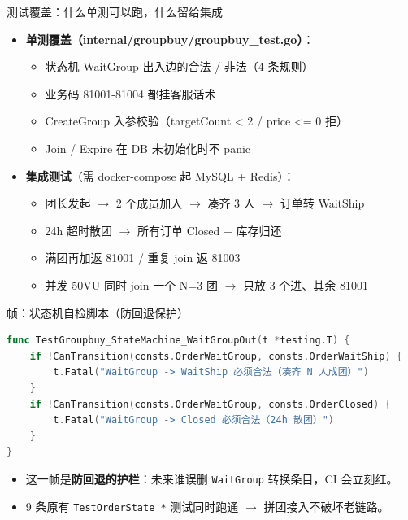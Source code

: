 \documentclass[aspectratio=169,11pt]{beamer}
\begin{document}
\begin{frame}[shrink]{测试覆盖：什么单测可以跑，什么留给集成}
\begin{itemize}
  \item \textbf{单测覆盖（internal/groupbuy/groupbuy\_test.go）}：
  \begin{itemize}
    \item 状态机 WaitGroup 出入边的合法 / 非法（4 条规则）
    \item 业务码 81001-81004 都挂客服话术
    \item CreateGroup 入参校验（targetCount < 2 / price <= 0 拒）
    \item Join / Expire 在 DB 未初始化时不 panic
  \end{itemize}
  \item \textbf{集成测试}（需 docker-compose 起 MySQL + Redis）：
  \begin{itemize}
    \item 团长发起 $\to$ 2 个成员加入 $\to$ 凑齐 3 人 $\to$ 订单转 WaitShip
    \item 24h 超时散团 $\to$ 所有订单 Closed + 库存归还
    \item 满团再加返 81001 / 重复 join 返 81003
    \item 并发 50VU 同时 join 一个 N=3 团 $\to$ 只放 3 个进、其余 81001
  \end{itemize}
\end{itemize}
\end{frame}

\begin{frame}{帧：状态机自检脚本（防回退保护）}
\begin{lstlisting}[language=Go,caption={internal/groupbuy/groupbuy\_test.go 状态机检查}]
func TestGroupbuy_StateMachine_WaitGroupOut(t *testing.T) {
    if !CanTransition(consts.OrderWaitGroup, consts.OrderWaitShip) {
        t.Fatal("WaitGroup -> WaitShip 必须合法（凑齐 N 人成团）")
    }
    if !CanTransition(consts.OrderWaitGroup, consts.OrderClosed) {
        t.Fatal("WaitGroup -> Closed 必须合法（24h 散团）")
    }
}
\end{lstlisting}
\begin{itemize}
  \item 这一帧是\textbf{防回退的护栏}：未来谁误删 \texttt{WaitGroup} 转换条目，CI 会立刻红。
  \item 9 条原有 \texttt{TestOrderState\_*} 测试同时跑通 $\to$ 拼团接入不破坏老链路。
\end{itemize}
\end{frame}
\end{document}
